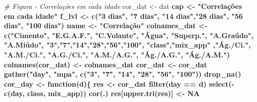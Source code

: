 \documentclass[]{article}
\newenvironment{Shaded}{\begin{snugshade}}{\end{snugshade}}
\newcommand{\CommentTok}[1]{\textcolor[rgb]{0.56,0.35,0.01}{\textit{#1}}}
\newcommand{\ControlFlowTok}[1]{\textcolor[rgb]{0.13,0.29,0.53}{\textbf{#1}}}
\newcommand{\KeywordTok}[1]{\textcolor[rgb]{0.13,0.29,0.53}{\textbf{#1}}}
\newcommand{\NormalTok}[1]{#1}
\newcommand{\OperatorTok}[1]{\textcolor[rgb]{0.81,0.36,0.00}{\textbf{#1}}}
\newcommand{\OtherTok}[1]{\textcolor[rgb]{0.56,0.35,0.01}{#1}}
\newcommand{\StringTok}[1]{\textcolor[rgb]{0.31,0.60,0.02}{#1}}
\begin{document}
\begin{Shaded}
\begin{Highlighting}[]
\CommentTok{# Figura - Correlações em cada idade}
\NormalTok{cor_dat <-}\StringTok{ }\NormalTok{dat }\OperatorTok{%
\NormalTok{cap <-}\StringTok{ "Correlações em cada idade"}
\NormalTok{f_lvl <-}\StringTok{ }\KeywordTok{c}\NormalTok{(}\StringTok{"3 dias"}\NormalTok{, }\StringTok{"7 dias"}\NormalTok{, }\StringTok{"14 dias"}\NormalTok{,}\StringTok{"28 dias"}\NormalTok{, }\StringTok{"56 dias"}\NormalTok{, }\StringTok{"100 dias"}\NormalTok{)}
\NormalTok{name <-}\StringTok{ "Correlação"}
\NormalTok{colnames_dat <-}\StringTok{ }\KeywordTok{c}\NormalTok{(}\StringTok{"Cimento"}\NormalTok{, }\StringTok{"E.G.A.F."}\NormalTok{, }\StringTok{"C.Volante"}\NormalTok{, }\StringTok{"Água"}\NormalTok{,}
                  \StringTok{"Superp."}\NormalTok{, }\StringTok{"A.Graúdo", "}\NormalTok{A.Miúdo",}
                  \StringTok{"3"}\NormalTok{,}\StringTok{"7"}\NormalTok{,}\StringTok{"14"}\NormalTok{,}\StringTok{"28"}\NormalTok{,}\StringTok{"56"}\NormalTok{,}\StringTok{"100"}\NormalTok{,}
                  \StringTok{"class"}\NormalTok{,}\StringTok{"mix_app"}\NormalTok{ ,}\StringTok{"Ág./Ci."}\NormalTok{,}
                  \StringTok{"A.M./Ci."}\NormalTok{, }\StringTok{"A.G./Ci."}\NormalTok{, }\StringTok{"A.M./A.G."}\NormalTok{,}
                  \StringTok{"Ág./A.G."}\NormalTok{, }\StringTok{"Ág./A.M."}\NormalTok{)}
\KeywordTok{colnames}\NormalTok{(cor_dat) <-}\StringTok{ }\NormalTok{colnames_dat}
\NormalTok{cor_dat <-}\StringTok{ }\NormalTok{cor_dat }\OperatorTok{%
\StringTok{  }\KeywordTok{gather}\NormalTok{(}\StringTok{"day"}\NormalTok{, }\StringTok{"mpa"}\NormalTok{, }\KeywordTok{c}\NormalTok{(}\StringTok{"3"}\NormalTok{, }\StringTok{"7"}\NormalTok{, }\StringTok{"14"}\NormalTok{, }\StringTok{"28"}\NormalTok{, }\StringTok{"56"}\NormalTok{, }\StringTok{"100"}\NormalTok{)) }\OperatorTok{%
\StringTok{  }\KeywordTok{drop_na}\NormalTok{()}
\NormalTok{cor_day <-}\StringTok{ }\ControlFlowTok{function}\NormalTok{(d)\{}
\NormalTok{  res <-}\StringTok{ }\NormalTok{cor_dat }\OperatorTok{%
\StringTok{    }\KeywordTok{filter}\NormalTok{(day }\OperatorTok{==}\StringTok{ }\NormalTok{d) }\OperatorTok{%
\StringTok{    }\KeywordTok{select}\NormalTok{(}\OperatorTok{-}\KeywordTok{c}\NormalTok{(day, class, mix_app)) }\OperatorTok{%
\StringTok{    }\KeywordTok{cor}\NormalTok{(.)}
\NormalTok{  res[}\KeywordTok{upper.tri}\NormalTok{(res)] <-}\StringTok{ }\OtherTok{NA}
}}}}}}
\end{Highlighting}
\end{Shaded}
\end{document}
